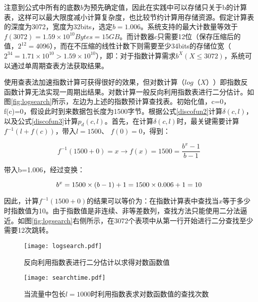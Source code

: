 注意到公式中所有的底数$ b $为预先确定值，因此在实践中可以存储只关于b的计算表，这样可以最大限度减小计算复杂度，也比较节约计算用存储资源。假定计算表的深度为3072，宽度为32bits，选定$ b=1.006 $。系统支持的最大计数量等效于$ f(3072)=1.59\times10^{10}Bytes=15GB $。而计数器$ c $只需要12位（保存压缩后的值，$ 2^{12}=4096 $），而在不压缩的线性计数下则需要至少34bits的存储位宽（$ 2^{34}=1.71\times10^{10}>1.59\times10^{10}$），即：对于指数计算需求$b^X (X \leq 3072)$，系统可以通过单周期查表方法获取结果。


使用查表法加速指数计算可获得很好的效果，但对数计算（$ log（X） $）即指数反函数计算无法实现一周期出结果。对数计算一般反向利用指数表进行二分估计。如图\ref{fig:logsearch}所示，左边为上述的指数预计算查找表。初始化值，c=0，f(c)=0，假设此时到来数据包长度为1500字节。根据公式\ref{discofun2}计算$ \delta(c,l)$，以及公式\ref{discofun3}计算$p_d(c,l) $。首先，在计算$ \delta(c,l)$时，最关键需要计算 $ f^{-1}(l+f(c)) $，带入$ l=1500 $、 $ f(0)=0 $，得到：

\begin{equation} \label{discofun4}
f^{-1}(1500+0) = x \rightarrow f(x)=1500 = \dfrac{b^x-1}{b-1}
\end{equation}

带入b=1.006，经过变换：

\begin{equation} \label{discofun5}
b^x=1500\times(b-1)+1\\
= 1500\times 0.006+1\\
=10
\end{equation}

因此，计算$ f^{-1}(1500+0) $的结果可以等价为：在指数计算表中查找当$ x $等于多少时指数值为10。由于指数值是非连续、非等差数列，查找方法只能使用二分法逼近。如图\ref{fig:logsearch}右侧所示，在3072个表项中从第一行开始进行二分查找至少需要12次跳转。


\begin{figure}[htbp]
	\centering 
	\vspace{-1.5mm}
	\begin{minipage}[t]{0.52\textwidth}
		\centering
		\texttt{[image: logsearch.pdf]}
		\caption{反向利用指数表进行二分估计以求得对数函数值} \label{fig:logsearch}
	\end{minipage}
	\begin{minipage}[t]{0.44\textwidth}
		\centering
		\texttt{[image: searchtime.pdf]}
		\caption{当流量中包长$l=1000$时利用指数表求对数函数值的查找次数} \label{fig:searchtime}
	\end{minipage}
\end{figure}

